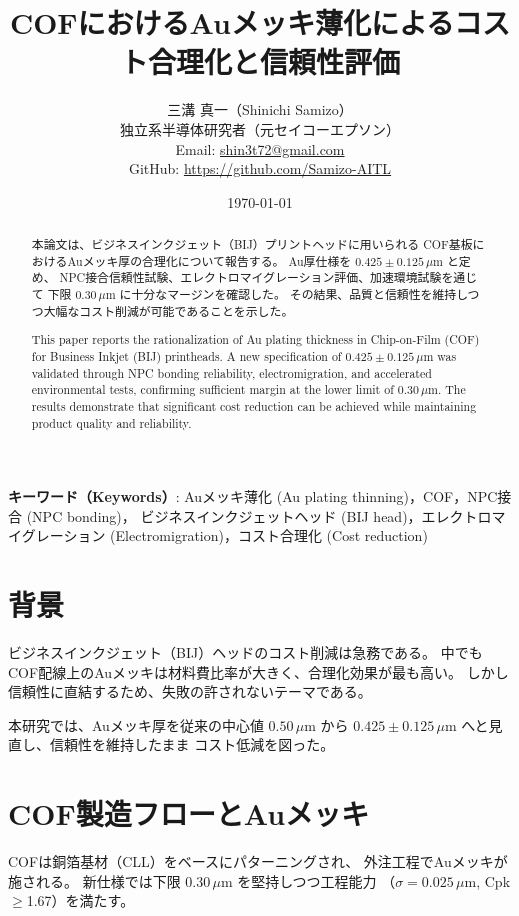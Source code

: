 \documentclass[a4paper,12pt]{article}
\title{COFにおけるAuメッキ薄化によるコスト合理化と信頼性評価}
\author{三溝 真一（Shinichi Samizo）\\
独立系半導体研究者（元セイコーエプソン）\\
Email: \href{mailto:shin3t72@gmail.com}{shin3t72@gmail.com}\\
GitHub: \url{https://github.com/Samizo-AITL}}
\date{\today}
\begin{document}
\maketitle

\begin{abstract}
本論文は、ビジネスインクジェット（BIJ）プリントヘッドに用いられる
COF基板におけるAuメッキ厚の合理化について報告する。
Au厚仕様を $0.425 \pm 0.125\,\mu\mathrm{m}$ と定め、
NPC接合信頼性試験、エレクトロマイグレーション評価、加速環境試験を通じて
下限 $0.30\,\mu\mathrm{m}$ に十分なマージンを確認した。
その結果、品質と信頼性を維持しつつ大幅なコスト削減が可能であることを示した。
\end{abstract}

\begin{abstract}
This paper reports the rationalization of Au plating thickness
in Chip-on-Film (COF) for Business Inkjet (BIJ) printheads.
A new specification of $0.425 \pm 0.125\,\mu\mathrm{m}$ was validated
through NPC bonding reliability, electromigration, and accelerated
environmental tests, confirming sufficient margin at the lower limit
of $0.30\,\mu\mathrm{m}$. The results demonstrate that significant cost reduction
can be achieved while maintaining product quality and reliability.
\end{abstract}

\textbf{キーワード（Keywords）}: Auメッキ薄化 (Au plating thinning)，COF，NPC接合 (NPC bonding)，
ビジネスインクジェットヘッド (BIJ head)，エレクトロマイグレーション (Electromigration)，コスト合理化 (Cost reduction)

\section{背景}
ビジネスインクジェット（BIJ）ヘッドのコスト削減は急務である。
中でもCOF配線上のAuメッキは材料費比率が大きく、合理化効果が最も高い。
しかし信頼性に直結するため、失敗の許されないテーマである。

本研究では、Auメッキ厚を従来の中心値 $0.50\,\mu\mathrm{m}$ から
$0.425 \pm 0.125\,\mu\mathrm{m}$ へと見直し、信頼性を維持したまま
コスト低減を図った。

\section{COF製造フローとAuメッキ}
COFは銅箔基材（CLL）をベースにパターニングされ、
外注工程でAuメッキが施される。
新仕様では下限 $0.30\,\mu\mathrm{m}$ を堅持しつつ工程能力
（$\sigma=0.025\,\mu\mathrm{m}$, Cpk$\geq$1.67）を満たす。
\end{document}
